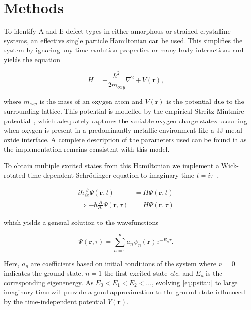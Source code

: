 \section{Methods}\label{sec:methods}

To identify A and B defect types in either amorphous or strained crystalline systems, an effective single particle Hamiltonian can be used.
This simplifies the system by ignoring any time evolution properties or many-body interactions and yields the equation

\begin{equation}
    H = -\frac{\hbar^2}{2m_{oxy}}\nabla^2+V(\mathbf{r}),
\end{equation}

where $m_{oxy}$ is the mass of an oxygen atom and $V(\mathbf{r})$ is the potential due to the surrounding lattice.
This potential is modelled by the empirical Streitz-Mintmire potential~\cite{Streitz1994,Zhou2004}, which adequately captures the variable oxygen charge states occurring when oxygen is present in a predominantly metallic environment like a JJ metal-oxide interface.
A complete description of the parameters used can be found in  as the implementation remains consistent with this model.

To obtain multiple excited states from this Hamiltonian we implement a Wick-rotated time-dependent Schr\"{o}dinger equation to imaginary time $t=i\tau$~\cite{Strickland2010},

\begin{align}
i \hbar \frac{\partial}{\partial t}\Psi(\mathbf{r},t) &= H\Psi(\mathbf{r},t)\\
\Rightarrow - \hbar \frac{\partial}{\partial \tau}\Psi(\mathbf{r},\tau) &= H\Psi(\mathbf{r},\tau)
\end{align}

which yields a general solution to the wavefunctions

\begin{equation}
\Psi(\mathbf{r},\tau) = \sum_{n=0}^\infty a_n\psi_n(\mathbf{r})e^{-E_n \tau}.\label{eq:psitau}
\end{equation}

Here, ${a_n}$ are coefficients based on initial conditions of the system where $n=0$ indicates the ground state, $n=1$ the first excited state \textit{etc}. and $E_n$ is the corresponding eigenenergy.
As $E_0 < E_1 < E_2 < \ldots$, evolving \cref{eq:psitau} to large imaginary time will provide a good approximation to the ground state influenced by the time-independent potential $V(\mathbf{r})$.

